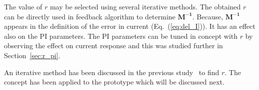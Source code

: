 The value of $r$ may be selected using several iterative methods. The obtained $r$ can be directly used in feedback algorithm to determine $\bm{M^{-1}}$. Because, $\bm{M^{-1}}$ appears in the definition of the error in current (Eq.~(\ref{eq:del_I})). It has an effect also on the PI parameters. The PI parameters can be tuned in concept with $r$ by observing the effect on current response and this was studied further in Section~\ref{sec:r_pi}.


An iterative method has been discussed in  the previous study~\cite{bea} to find $r$. The concept has been applied to the prototype which will be discussed next.











